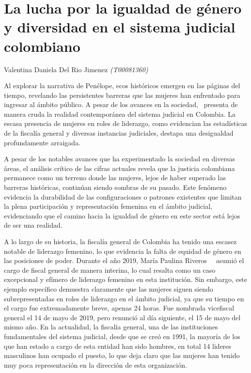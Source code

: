 \documentclass[letterpaper, 12pt]{article}
\begin{document}
\section*{La lucha por la igualdad de género y diversidad en el sistema judicial colombiano}

\noindent\makebox[\linewidth]{\rule{\textwidth}{0.4pt}}

Valentina Daniela Del Rio Jimenez \textit{(T00081360)}

\noindent\makebox[\linewidth]{\rule{\textwidth}{0.4pt}}

Al explorar la narrativa de Penélope, ecos históricos
emergen en las páginas del tiempo, revelando las
persistentes barreras que las mujeres han enfrentado para
ingresar al ámbito público. A pesar de los avances en la
sociedad,~\textcite{Dejusticia_2023_MariaAdelaida} presenta
de manera cruda la realidad contemporánea del sistema
judicial en Colombia. La escasa presencia de mujeres en
roles de liderazgo, como evidencian las estadísticas de la
fiscalía general y diversas instancias judiciales, destapa
una desigualdad profundamente arraigada.

A pesar de los notables avances que ha experimentado la
sociedad en diversas áreas, el análisis crítico de las
cifras actuales revela que la justicia colombiana permanece
como un terreno donde las mujeres, lejos de haber superado
las barreras históricas, continúan siendo sombras de su
pasado. Este fenómeno evidencia la durabilidad de las
configuraciones o patrones existentes que limitan la plena
participación y representación femenina en el ámbito
judicial, evidenciando que el camino hacia la igualdad de
género en este sector está lejos de ser una realidad.

A lo largo de su historia, la fiscalía general de Colombia
ha tenido una escasez notable de liderazgo femenino, lo que
evidencia la falta de equidad de género en las posiciones
de poder. Durante el año 2019, María Paulina
Riveros~\cite{Colprensa_2016}~\cite{Vacía_Vacía_2023}
asumió el cargo de fiscal general de manera interina, lo
cual resalta como un caso excepcional y efímero de
liderazgo femenino en esta institución. Sin embargo, este
ejemplo específico demuestra claramente que las mujeres
siguen siendo subrepresentadas en roles de liderazgo en el
ámbito judicial, ya que su tiempo en el cargo fue
extremadamente breve, apenas 24 horas. Fue nombrada
vicefiscal general el 14 de mayo de 2019, pero renunció al
día siguiente, el 15 de mayo del mismo año. En la
actualidad, la fiscalía general, una de las instituciones
fundamentales del sistema judicial, desde que se creó en
1991, la mayoría de los que han estado a cargo de esta
entidad han sido hombres, en total 14 lideres masculinos
han ocupado el puesto, lo que deja claro que las mujeres
han tenido muy poca representación en la dirección de esta
organización.
\end{document}
